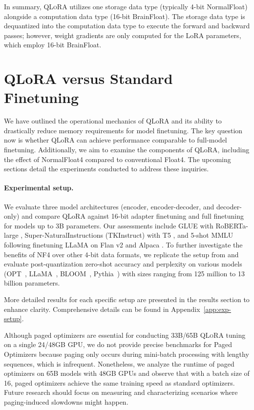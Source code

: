 In summary, \textsc{QLoRA} utilizes one storage data type (typically 4-bit NormalFloat) alongside a computation data type (16-bit BrainFloat). The storage data type is dequantized into the computation data type to execute the forward and backward passes; however, weight gradients are only computed for the LoRA parameters, which employ 16-bit BrainFloat.

\section{QLoRA versus Standard Finetuning}
\label{sec:comp_to_std}

We have outlined the operational mechanics of QLoRA and its ability to drastically reduce memory requirements for model finetuning. The key question now is whether QLoRA can achieve performance comparable to full-model finetuning. Additionally, we aim to examine the components of QLoRA, including the effect of NormalFloat4 compared to conventional Float4. The upcoming sections detail the experiments conducted to address these inquiries.

\paragraph{Experimental setup.} We evaluate three model architectures (encoder, encoder-decoder, and decoder-only) and compare QLoRA against 16-bit adapter finetuning and full finetuning for models up to 3B parameters. Our assessments include GLUE \citep{wang2018glue} with RoBERTa-large \citep{liu2019roberta}, Super-NaturalInstructions (TKInstruct) \citep{wang2022super} with T5 \citep{t5}, and 5-shot MMLU \citep{hendrycksmeasuring} following finetuning LLaMA on Flan v2 \citep{longpre2023flan} and Alpaca \citep{alpaca}. To further investigate the benefits of NF4 over other 4-bit data formats, we replicate the setup from \citet{dettmers2022case} and evaluate post-quantization zero-shot accuracy and perplexity on various models (OPT~\citep{zhang2022opt}, LLaMA~\citep{touvron2023llama}, BLOOM~\citep{scao2022bloom}, Pythia~\citep{biderman2023pythia}) with sizes ranging from 125 million to 13 billion parameters.

More detailed results for each specific setup are presented in the results section to enhance clarity. Comprehensive details can be found in Appendix~\ref{app:exp-setup}.

Although paged optimizers are essential for conducting 33B/65B \textsc{QLoRA} tuning on a single 24/48GB GPU, we do not provide precise benchmarks for Paged Optimizers because paging only occurs during mini-batch processing with lengthy sequences, which is infrequent. Nonetheless, we analyze the runtime of paged optimizers on 65B models with 48GB GPUs and observe that with a batch size of 16, paged optimizers achieve the same training speed as standard optimizers. Future research should focus on measuring and characterizing scenarios where paging-induced slowdowns might happen.

